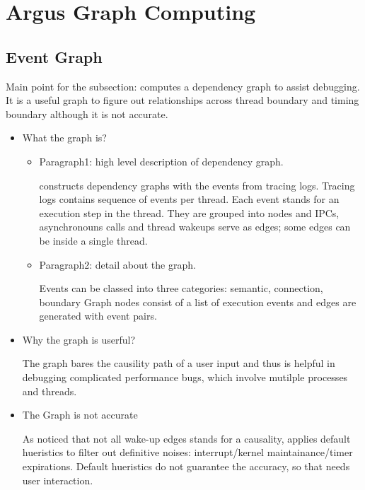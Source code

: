 \section{Argus Graph Computing}

\subsection{Event Graph}

Main point for the subsection: \xxx computes a dependency graph to assist
debugging. It is a useful graph to figure out relationships across thread
boundary and timing boundary although it is not accurate.

\begin{itemize}
\item What the graph is?

	\begin{itemize}
	\item Paragraph1: high level description of dependency graph.

\xxx constructs dependency graphs with the events from tracing logs. Tracing
logs contains sequence of events per thread. Each event stands for an execution
step in the thread. They are grouped into nodes and IPCs, asynchronouns calls
and thread wakeups serve as edges; some edges can be inside a single thread.

	\item Paragraph2: detail about the graph.

Events can be classed into three categories: semantic, connection, boundary
Graph nodes consist of a list of execution events and edges are generated with
event pairs.

	\end{itemize}

\item Why the graph is userful?

The graph bares the causility path of a user input and thus is helpful in
debugging complicated performance bugs, which involve mutilple processes and
threads.

\item The Graph is not accurate

As noticed that not all wake-up edges stands for a causality, \xxx applies
default hueristics to filter out definitive noises: interrupt/kernel
maintainance/timer expirations. Default hueristics do not guarantee the
accuracy, so that \xxx needs user interaction.

\end{itemize}

